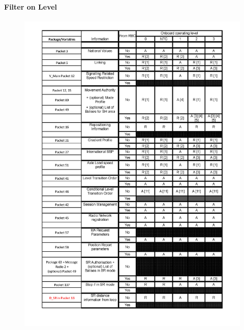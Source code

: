 \documentclass{template/openetcs_report}
\begin{document}
\paragraph{Filter on Level}
\begin{figure}[hbtp]
\centering
\includegraphics [scale=0.6]{images/LevelFilter1}
\end{figure}
\end{document}
